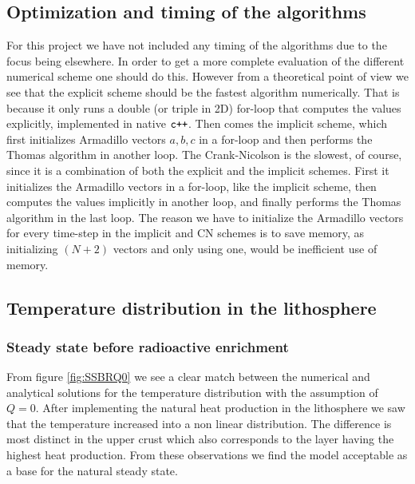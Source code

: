 \documentclass[%
 reprint,
nofootinbib,
aps,
]{revtex4-1}
\begin{document}


\subsection{Optimization and timing of the algorithms}
For this project we have not included any timing of the algorithms due to the focus being elsewhere. In order to get a more complete evaluation of the different numerical scheme one should do this. However from a theoretical point of view we see that the explicit scheme should be the fastest algorithm numerically. That is because it only runs a double (or triple in 2D) for-loop that computes the values explicitly, implemented in native $\verb!c++!$. Then comes the implicit scheme, which first initializes Armadillo vectors $a,b,c$ in a for-loop and then performs the Thomas algorithm in another loop. The Crank-Nicolson is the slowest, of course, since it is a combination of both the explicit and the implicit schemes. First it initializes the Armadillo vectors in a for-loop, like the implicit scheme, then computes the values implicitly in another loop, and finally performs the Thomas algorithm in the last loop. The reason we have to initialize the Armadillo vectors for every time-step in the implicit and CN schemes is to save memory, as initializing $(N+2)$ vectors and only using one, would be inefficient use of memory.


\subsection{Temperature distribution in the lithosphere}

\subsubsection{Steady state before radioactive enrichment}
From figure \ref{fig:SSBRQ0} we see a clear match between the numerical and analytical solutions for the temperature distribution with the assumption of $Q = 0$. After implementing the natural heat production in the lithosphere we saw that the temperature increased into a non linear distribution. The difference is most distinct in the upper crust which also corresponds to the layer having the highest heat production. From these observations we find the model acceptable as a base for the natural steady state.
\end{document}
